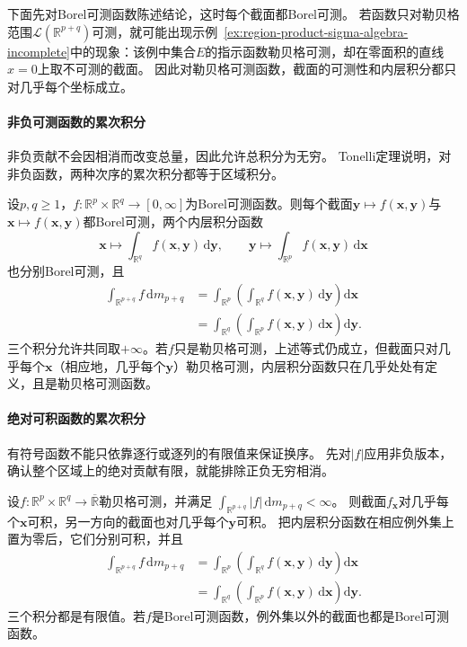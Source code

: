 下面先对Borel可测函数陈述结论，这时每个截面都Borel可测。
若函数只对勒贝格范围$\mathcal L(\mathbb R^{p+q})$可测，就可能出现示例~\ref{ex:region-product-sigma-algebra-incomplete}中的现象：该例中集合$E$的指示函数勒贝格可测，却在零面积的直线$x=0$上取不可测的截面。
因此对勒贝格可测函数，截面的可测性和内层积分都只对几乎每个坐标成立。

\paragraph{非负可测函数的累次积分}

非负贡献不会因相消而改变总量，因此允许总积分为无穷。
Tonelli定理说明，对非负函数，两种次序的累次积分都等于区域积分。
\begin{theorem}[Tonelli定理]
\label{thm:analysis-tonelli-fubini}
设$p,q\geq1$，$f:\mathbb R^p\times\mathbb R^q\to[0,\infty]$为Borel可测函数。则每个截面$\bm y\mapsto f(\bm x,\bm y)$与$\bm x\mapsto f(\bm x,\bm y)$都Borel可测，两个内层积分函数
\[
 \bm x\longmapsto\int_{\mathbb R^q}f(\bm x,\bm y)\,\mathrm d\bm y,\qquad
 \bm y\longmapsto\int_{\mathbb R^p}f(\bm x,\bm y)\,\mathrm d\bm x
\]
也分别Borel可测，且
\[
 \begin{aligned}
 \int_{\mathbb R^{p+q}}f\,\mathrm dm_{p+q}
 &=\int_{\mathbb R^p}\left(\int_{\mathbb R^q}f(\bm x,\bm y)\,\mathrm d\bm y\right)\mathrm d\bm x\\
 &=\int_{\mathbb R^q}\left(\int_{\mathbb R^p}f(\bm x,\bm y)\,\mathrm d\bm x\right)\mathrm d\bm y.
 \end{aligned}
\]
三个积分允许共同取$+\infty$。若$f$只是勒贝格可测，上述等式仍成立，但截面只对几乎每个$\bm x$（相应地，几乎每个$\bm y$）勒贝格可测，内层积分函数只在几乎处处有定义，且是勒贝格可测函数。
\end{theorem}

\paragraph{绝对可积函数的累次积分}

有符号函数不能只依靠逐行或逐列的有限值来保证换序。
先对$|f|$应用非负版本，确认整个区域上的绝对贡献有限，就能排除正负无穷相消。
\begin{theorem}[Fubini定理]
\label{thm:analysis-fubini-integrable}
设$f:\mathbb R^p\times\mathbb R^q\to\overline{\mathbb R}$勒贝格可测，并满足
$\int_{\mathbb R^{p+q}}|f|\,\mathrm dm_{p+q}<\infty$。
则截面$f_{\bm x}$对几乎每个$\bm x$可积，另一方向的截面也对几乎每个$\bm y$可积。
把内层积分函数在相应例外集上置为零后，它们分别可积，并且
\[
 \begin{aligned}
 \int_{\mathbb R^{p+q}}f\,\mathrm dm_{p+q}
 &=\int_{\mathbb R^p}\left(\int_{\mathbb R^q}f(\bm x,\bm y)\,\mathrm d\bm y\right)\mathrm d\bm x\\
 &=\int_{\mathbb R^q}\left(\int_{\mathbb R^p}f(\bm x,\bm y)\,\mathrm d\bm x\right)\mathrm d\bm y.
 \end{aligned}
\]
三个积分都是有限值。若$f$是Borel可测函数，例外集以外的截面也都是Borel可测函数。
\end{theorem}

